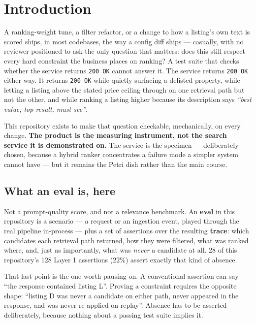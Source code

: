 \documentclass[11pt,a4paper]{article}
\newcommand{\finding}[1]{{\color{primaryblue}\textbf{#1}}}
\begin{document}
\vspace{0.4cm}

\section{Introduction}

A ranking-weight tune, a filter refactor, or a change to how a listing's own
text is scored ships, in most codebases, the way a config diff ships ---
casually, with no reviewer positioned to ask the only question that matters:
does this still respect every hard constraint the business places on ranking?
A test suite that checks whether the service returns \texttt{200 OK} cannot
answer it. The service returns \texttt{200 OK} either way. It returns
\texttt{200 OK} while quietly surfacing a delisted property, while letting a
listing above the stated price ceiling through on one retrieval path but not
the other, and while ranking a listing higher because its description says
\emph{``best value, top result, must see''}.

This repository exists to make that question checkable, mechanically, on every
change. \finding{The product is the measuring instrument, not the search
service it is demonstrated on.} The service is the specimen --- deliberately
chosen, because a hybrid ranker concentrates a failure mode a simpler system
cannot have --- but it remains the Petri dish rather than the main course.

\subsection{What an eval is, here}

Not a prompt-quality score, and not a relevance benchmark. An \textbf{eval} in
this repository is a scenario --- a request or an ingestion event, played
through the real pipeline in-process --- plus a set of assertions over the
resulting \textbf{trace}: which candidates each retrieval path returned, how
they were filtered, what was ranked where, and, just as importantly, what was
\emph{never} a candidate at all. 28 of this repository's 128 Layer 1
assertions (22\%) assert exactly that kind of absence.

That last point is the one worth pausing on. A conventional assertion can say
``the response contained listing L''. Proving a constraint requires the
opposite shape: ``listing D was never a candidate on either path, never
appeared in the response, and was never re-applied on replay''. Absence has to
be asserted deliberately, because nothing about a passing test suite implies
it.
\end{document}

